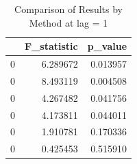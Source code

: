 \begin{table}
\caption{Comparison of Results by Method at lag = 1}
\label{tab:results_by_method}
\begin{tabular}{lrr}
\toprule
 & F\_statistic & p\_value \\
\midrule
0 & 6.289672 & 0.013957 \\
0 & 8.493119 & 0.004508 \\
0 & 4.267482 & 0.041756 \\
0 & 4.173811 & 0.044011 \\
0 & 1.910781 & 0.170336 \\
0 & 0.425453 & 0.515910 \\
\bottomrule
\end{tabular}
\end{table}

